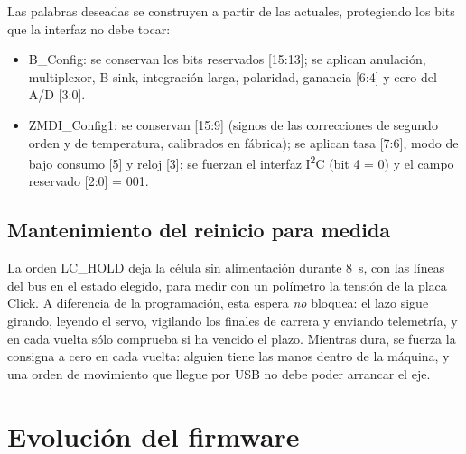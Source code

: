 Las palabras deseadas se construyen a partir de las actuales, protegiendo los bits que la interfaz no
debe tocar:
\begin{itemize}
  \item B\_Config: se conservan los bits reservados [15:13]; se aplican anulación, multiplexor,
        B-sink, integración larga, polaridad, ganancia [6:4] y cero del A/D [3:0].
  \item ZMDI\_Config1: se conservan [15:9] (signos de las correcciones de segundo orden y de
        temperatura, calibrados en fábrica); se aplican tasa [7:6], modo de bajo consumo [5] y reloj
        [3]; se fuerzan el interfaz I\textsuperscript{2}C (bit 4 = 0) y el campo reservado [2:0] = 001.
\end{itemize}

\subsection{Mantenimiento del reinicio para medida}

La orden LC\_HOLD deja la célula sin alimentación durante \SI{8}{\second}, con las líneas del bus en
el estado elegido, para medir con un polímetro la tensión de la placa Click. A diferencia de la
programación, esta espera \emph{no} bloquea: el lazo sigue girando, leyendo el servo, vigilando los
finales de carrera y enviando telemetría, y en cada vuelta sólo comprueba si ha vencido el plazo.
Mientras dura, se fuerza la consigna a cero en cada vuelta: alguien tiene las manos dentro de la
máquina, y una orden de movimiento que llegue por USB no debe poder arrancar el eje.

\section{Evolución del firmware}

